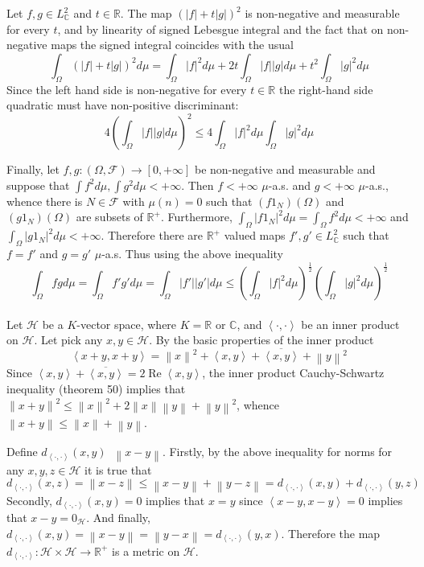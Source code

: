 \documentclass[a4paper]{article}
\newcommand{\clo}[1]{\left [ #1 \right ]}
\newcommand{\brac}[1]{\left ( #1 \right )}
\newcommand{\abs}[1]{\left | #1 \right |}
\newcommand{\nrm}[1]{\left\| #1 \right \|}
\newcommand{\brkt}[1]{\left\langle #1 \right\rangle}
\newcommand{\Real}{\mathbb{R}}
\newcommand{\Zinf}{\clo{ 0, +\infty }}
\newcommand{\Cplx}{\mathbb{C}}
\newcommand{\Hcal}{\mathcal{H}}
\newcommand{\Fcal}{\mathcal{F}}
\newcommand{\defn}{\mathop{\overset{\Delta}{=}}\nolimits}
\newcommand{\re}{\operatorname{Re}\nolimits}
\begin{document}
Let $f,g\in L^2_\Cplx$ and $t\in \Real$. The map $\brac{\abs{f}+t\abs{g}}^2$ is non-negative and measurable for every $t$, and by linearity of signed Lebesgue integral and the fact that on non-negative maps the signed integral coincides with the usual \[\int_\Omega \brac{\abs{f}+t\abs{g}}^2 d\mu = \int_\Omega \abs{f}^2 d\mu + 2 t \int_\Omega \abs{f}\abs{g} d\mu + t^2 \int_\Omega \abs{g}^2 d\mu\] Since the left hand side is non-negative for every $t\in \Real$ the right-hand side quadratic must have non-positive discriminant:\[ 4 \brac{\int_\Omega \abs{f}\abs{g} d\mu }^2 \leq 4 \int_\Omega \abs{f}^2 d\mu \int_\Omega \abs{g}^2 d\mu\]

Finally, let $f,g:\brac{\Omega, \Fcal}\to \Zinf$ be non-negative and measurable and suppose that $\int f^2 d\mu, \int g^2 d\mu<+\infty$. Then $f<+\infty$ $\mu$-a.s. and $g<+\infty$ $\mu$-a.s., whence there is $N\in \Fcal$ with $\mu\brac{n}=0$ such that $\brac{f 1_N}\brac{\Omega}$ and $\brac{g 1_N}\brac{\Omega}$ are subsets of $\Real^+$. Furthermore, $\int_\Omega \abs{f 1_N}^2 d\mu= \int_\Omega f^2 d\mu < +\infty$ and $\int_\Omega \abs{g 1_N}^2 d\mu < +\infty$. Therefore there are $\Real^+$ valued maps $f',g'\in L^2_\Cplx$ such that $f=f'$ and $g=g'$ $\mu$-a.s. Thus using the above inequality \[ \int_\Omega fg d\mu = \int_\Omega f'g' d\mu = \int_\Omega \abs{f'}\abs{g'} d\mu \leq \brac{\int_\Omega \abs{f}^2 d\mu}^\frac{1}{2} \brac{\int_\Omega \abs{g}^2 d\mu}^\frac{1}{2}\]\\

Let $\Hcal$ be a $K$-vector space, where $K=\Real$ or $\Cplx$, and $\brkt{\cdot,\cdot}$ be an inner product on $\Hcal$. Let pick any $x,y\in \Hcal$. By the basic properties of the inner product \[\brkt{x+y,x+y} = \nrm{x}^2 + \brkt{x,y} + \overline{\brkt{x,y}} + \nrm{y}^2\] Since $\brkt{x,y}+\overline{\brkt{x,y}} = 2 \re \brkt{x,y}$, the inner product Cauchy-Schwartz inequality (theorem 50) implies that $\nrm{x+y}^2 \leq \nrm{x}^2 + 2 \nrm{x}\nrm{y} + \nrm{y}^2$, whence $\nrm{x+y}\leq \nrm{x}+\nrm{y}$.

Define $d_{\brkt{\cdot,\cdot}}\brac{x,y}\defn \nrm{x-y}$. Firstly, by the above inequality for norms for any $x,y,z\in \Hcal$ it is true that \[d_{\brkt{\cdot,\cdot}}\brac{x,z} = \nrm{x-z}\leq \nrm{x-y}+\nrm{y-z} = d_{\brkt{\cdot,\cdot}}\brac{x,y} + d_{\brkt{\cdot,\cdot}}\brac{y,z}\] Secondly, $d_{\brkt{\cdot,\cdot}}\brac{x,y} = 0$ implies that $x=y$ since $\brkt{x-y,x-y}=0$ implies that $x-y=0_\Hcal$. And finally, $d_{\brkt{\cdot,\cdot}}\brac{x,y} = \nrm{x-y} = \nrm{y-x} = d_{\brkt{\cdot,\cdot}}\brac{y,x}$. Therefore the map $d_{\brkt{\cdot,\cdot}}:\Hcal\times\Hcal\to \Real^+$ is a metric on $\Hcal$.
\end{document}
